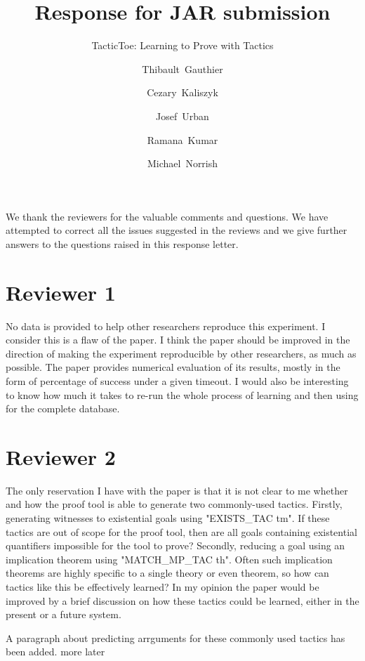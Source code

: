 \documentclass[]{scrartcl}
\title{Response for JAR submission}
\subtitle{TacticToe: Learning to Prove with Tactics}
\author{\mbox{Thibault Gauthier} \and \mbox{Cezary Kaliszyk} \and \mbox{Josef
		Urban} \and \mbox{Ramana Kumar} \and \mbox{Michael Norrish}}
\begin{document}
\maketitle

We thank the reviewers for the valuable comments and questions. We have 
attempted to correct all the issues suggested in the reviews and we give 
further answers to the questions raised in this response letter.

\section*{Reviewer 1}

\begin{leftbar}
No data is provided to help other researchers reproduce this experiment.  I 
consider this is a flaw of the paper.  I think the paper should be improved in 
the direction of making the experiment reproducible by other researchers, as 
much as possible. The paper provides numerical evaluation of its results, 
mostly in the form of 
percentage of success under a given timeout.   I would also be interesting to 
know how much it takes to re-run the whole process of learning and then using 
for the complete database.
\end{leftbar}

\section*{Reviewer 2}

\begin{leftbar}
The only reservation I have with the paper is that it is not clear to me 
whether and how the proof tool is able to generate two commonly-used tactics. 
Firstly,
generating witnesses to existential goals using "EXISTS_TAC tm". If these 
tactics are out of scope for the proof tool, then are all goals containing 
existential
quantifiers impossible for the tool to prove? Secondly, reducing a goal using 
an implication theorem using "MATCH_MP_TAC th". Often such implication theorems 
are
highly specific to a single theory or even theorem, so how can tactics like 
this be effectively learned? In my opinion the paper would be improved by a 
brief
discussion on how these tactics could be learned, either in the present or a 
future system.
\end{leftbar}

A paragraph about predicting arrguments for these commonly used tactics has 
been added. more later
\end{document}
